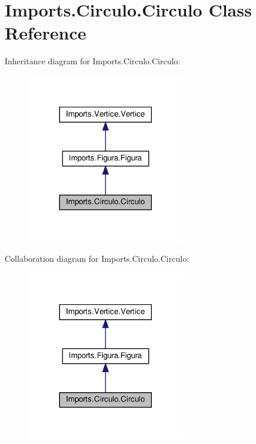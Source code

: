 \hypertarget{class_imports_1_1_circulo_1_1_circulo}{}\section{Imports.\+Circulo.\+Circulo Class Reference}
\label{class_imports_1_1_circulo_1_1_circulo}


Inheritance diagram for Imports.\+Circulo.\+Circulo\+:
\nopagebreak
\begin{figure}[H]
\begin{center}
\leavevmode
\includegraphics[width=197pt]{class_imports_1_1_circulo_1_1_circulo__inherit__graph}
\end{center}
\end{figure}


Collaboration diagram for Imports.\+Circulo.\+Circulo\+:
\nopagebreak
\begin{figure}[H]
\begin{center}
\leavevmode
\includegraphics[width=197pt]{class_imports_1_1_circulo_1_1_circulo__coll__graph}
\end{center}
\end{figure}
